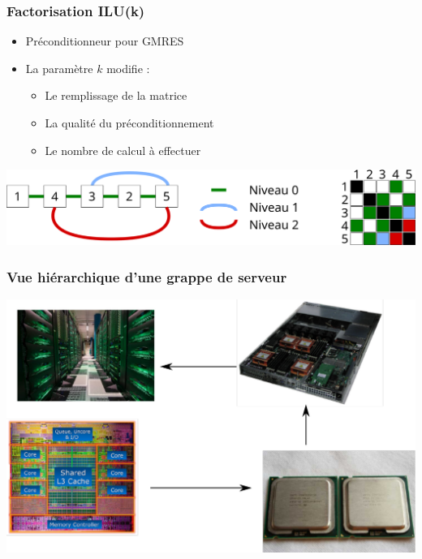 \documentclass{beamer}
\begin{document}
\begin{frame}
  \frametitle{Factorisation ILU(k)}

  \begin{itemize}
    \item Préconditionneur pour GMRES
    \item La paramètre $k$ modifie :
      \begin{itemize}
        \item Le remplissage de la matrice
        \item La qualité du préconditionnement
        \item Le nombre de calcul à effectuer
      \end{itemize}
  \end{itemize}

  \centerline{\includegraphics[width=0.9\linewidth]{iluk_filling}}

\end{frame}


\begin{frame}
  \frametitle{Vue hiérarchique d'une grappe de serveur}

  \centerline{\includegraphics[width=\linewidth]{cluster}}
\end{frame}
\end{document}
